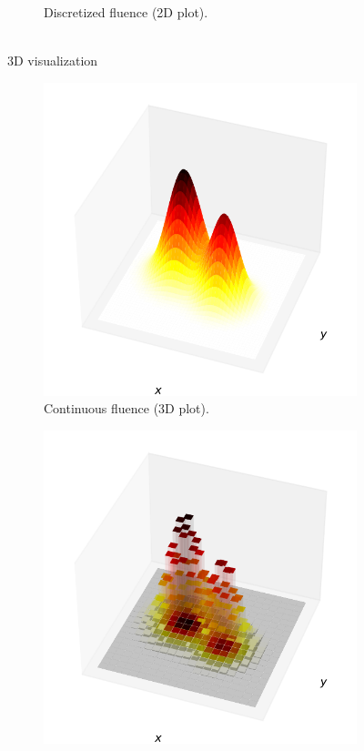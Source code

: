 \begin{figure}
\begin{subfigure}[c]{0.45\textwidth}
		\caption{Discretized fluence (2D plot).}
		\label{fig:fluence_bixel_2D_discrete}
	\end{subfigure}
	\\
	\vspace{5mm}
	3D visualization
	\\
	\begin{subfigure}[c]{0.45\textwidth}
		\includegraphics[width=\linewidth]{fluence_continuous_3D.pdf}
		\caption{Continuous fluence (3D plot).}
		\label{fig:fluence_bixel_3D_continuous}
	\end{subfigure}
	\begin{subfigure}[c]{0.45\textwidth}
		\includegraphics[width=\linewidth]{fluence_discrete_3D.pdf}

\end{subfigure}
\end{figure}

